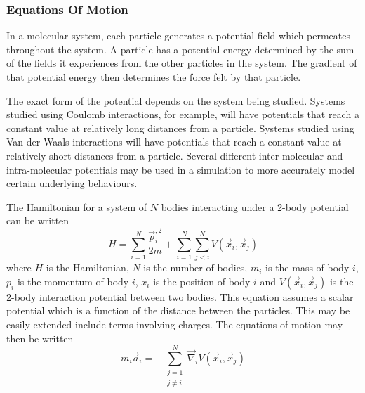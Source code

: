 \subsubsection{Equations Of Motion}

%
In a molecular system, each particle generates a potential field
which permeates throughout the system.
%
A particle has a potential energy determined by the sum
of the fields it experiences from the other particles in the system.
%
The gradient of that potential energy then determines
the force felt by that particle.

%
The exact form of the potential depends on the system being studied.
%
Systems studied using Coulomb interactions, for example,
will have potentials that reach a constant value at relatively long distances
from a particle.
%
Systems studied using Van der Waals interactions will have
potentials that reach a constant value at relatively short distances from
a particle.
%
Several different inter-molecular and intra-molecular potentials may be used
in a simulation to more accurately model certain underlying behaviours.


%
The Hamiltonian for a system of $N$ bodies
interacting under a 2-body potential can be written
\begin{equation}
    H = \sum_{i=1}^N \frac{\vec{p}_i^{,2}}{2 m}
        + \sum_{i=1}^N \sum_{j<i}^N V(\vec{x}_i, \vec{x}_j)
\end  {equation}
where $H$ is the Hamiltonian,
$N$ is the number of bodies,
$m_i$ is the mass of body $i$,
$p_i$ is the momentum of body $i$,
$x_i$ is the position of body $i$ and
$V(\vec{x}_i, \vec{x}_j)$ is the 2-body interaction potential
between two bodies.
%
This equation assumes a scalar potential which is
a function of the distance between the particles.
%
This may be easily extended include terms involving charges.
%
The equations of motion may then be written
\begin{equation}
    m_i \vec{a}_i = -\sum_{\substack{j=1\\j\ne{}i}}^N
                    \vec{\nabla}_i V(\vec{x}_i, \vec{x}_j)
\end  {equation}


